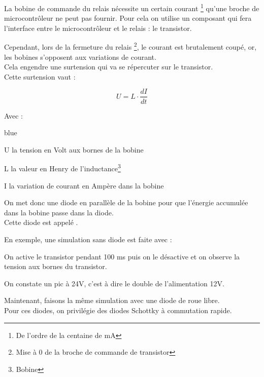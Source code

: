 La bobine de commande du relais nécessite un certain courant \footnote{De l'ordre de la centaine de mA} qu'une broche de microcontrôleur ne peut pas fournir.
Pour cela on utilise un composant qui fera l'interface entre le microcontrôleur et le relais : le transistor.


Cependant, lors de la fermeture du relais \footnote{Mise à 0 de la broche de commande de transistor}, le courant est brutalement coupé, or, les bobines s'opposent aux variations de courant.\\
Cela engendre une surtension qui va se répercuter sur le transistor.\\

Cette surtension vaut : 

$$ U = L\cdot \frac{dI}{dt}$$

Avec : 

\begin{items}{blue}{\Triangle}
    \item U la tension en Volt aux bornes de la bobine
    \item L la valeur en Henry de l'inductance\footnote{Bobine}
    \item I la variation de courant en Ampère dans la bobine
\end{items}

On met donc une diode en parallèle de la bobine pour que l’énergie accumulée dans la bobine passe dans la diode.\\
Cette diode est appelé .

En exemple, une simulation sans diode est faite avec  : 


On active le transistor pendant 100 ms puis on le désactive et on observe la tension aux bornes du transistor.


On constate un pic à 24V, c'est à dire le double de l'alimentation 12V.

Maintenant, faisons la même simulation avec une diode de roue libre. \\Pour ces diodes, on privilégie des diodes Schottky à commutation rapide.



